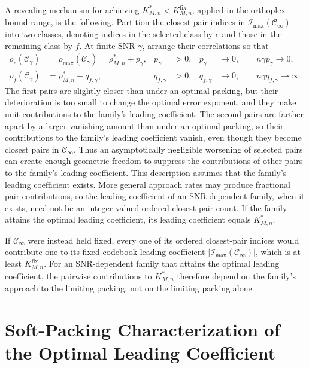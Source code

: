 \documentclass[12pt,draftclsnofoot,onecolumn]{IEEEtran}
\newcommand{\cC}{\mathcal{C}}
\newcommand{\cI}{\mathcal{I}}
\theoremstyle{definition}
\begin{document}
A revealing mechanism for achieving
\(K^{\ast}_{M,n}<K^{\mathrm{fix}}_{M,n}\), applied in the
orthoplex-bound range, is the following.  Partition the closest-pair indices
in \(\cI_{\max}(\cC_\infty)\) into two classes, denoting indices in the
selected class by \(e\) and those in the remaining class by \(f\).  At
finite SNR \(\gamma\), arrange their correlations so that
\begin{equation}
\begin{aligned}
  \rho_e(\cC_\gamma)
  &=\rho_{\max}(\cC_\gamma)
    =\rho^{\ast}_{M,n}+p_\gamma,
  & p_\gamma&>0,
  & p_{\gamma}&\longrightarrow0,
  \qquad n\gamma p_\gamma\longrightarrow0,\\
  \rho_f(\cC_\gamma)
  &=\rho^{\ast}_{M,n}-q_{f,\gamma},
  & q_{f,\gamma}&>0,
  & q_{f,\gamma}&\longrightarrow0,
  \qquad n\gamma q_{f,\gamma}\longrightarrow\infty.
\end{aligned}
  \label{eq:section2-two-scale-mechanism}
\end{equation}
The first pairs are slightly closer than under an optimal packing, but
their deterioration is too small to change the optimal error exponent,
and they make unit contributions to the family's leading coefficient.
The second pairs are farther apart by a larger vanishing amount than
under an optimal packing, so their contributions to the family's leading
coefficient vanish, even though they become closest pairs in
\(\cC_\infty\).  Thus an asymptotically negligible worsening of selected
pairs can create enough geometric freedom to suppress the contributions
of other pairs to the family's leading coefficient.  This description
assumes that the family's leading coefficient exists.  More general
approach rates may produce fractional pair contributions, so the leading
coefficient of an SNR-dependent family, when it exists, need not be an
integer-valued ordered closest-pair count.  If the family attains the
optimal leading coefficient, its leading coefficient equals
\(K^{\ast}_{M,n}\).

If \(\cC_\infty\) were instead held fixed, every one of its ordered
closest-pair indices would contribute one to its fixed-codebook leading
coefficient \(\lvert\cI_{\max}(\cC_\infty)\rvert\), which is at least
\(K^{\mathrm{fix}}_{M,n}\).  For an SNR-dependent family that attains the
optimal leading coefficient, the pairwise contributions to
\(K^{\ast}_{M,n}\) therefore depend on the family's approach to the
limiting packing, not on the limiting packing alone.


\section{Soft-Packing Characterization of the Optimal Leading Coefficient}
\label{sec:soft-packing-characterization}
\end{document}
